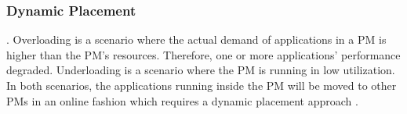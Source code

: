 

\subsubsection{Dynamic Placement}

. Overloading is a scenario where the actual demand of applications in a PM is higher than the PM's resources. Therefore, one or more applications' performance degraded. Underloading is a scenario where the PM is running in low utilization. In both scenarios, the applications running inside the PM will be moved to other PMs in an online fashion which requires a dynamic placement approach \cite{Borodin:2cY4439E}.





